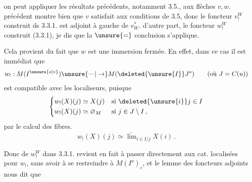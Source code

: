 on peut appliquer les résultats précédents,
notamment 3.5., aux flèches $v,w$. 
 précédent montre bien que $v$
satisfait aux conditions de 3.5, donc
le foncteur $v_!^W$ construit ds 3.3.1. est
adjoint à gauche de $v_W^*$.  d'autre part,
le foncteur $w_!^W$ construit  (3.3.1), je
dis que la $\unsure{=}$ conclusion s'applique.

Cela provient du fait que $w$ est une
immersion fermée. En effet, dans ce
cas il est immédiat que 
\[
w_!:M(I^{\unsure{o|\circ}})\unsure{\text{---}|\to} M(\deleted{\unsure{I}}J^o)\qquad(\text{où }J=C(u))
\]
est compatible avec les localiseurs,
puisque  
\[
\left\{\begin{aligned}
 w_!(X)(j)&\simeq X(j) &&\text{si }\deleted{\unsure{i}}j\in I\\
 w_!(X)(j)&\simeq\varnothing_M &&\text{si }j\in J\setminus I\,,
\end{aligned}\right.
\]
par le calcul des fibres.
\[
w_!(X)(j)\simeq\underrightarrow{\lim}_{i\in I/j}X(i)\,.
\]

Donc   de $w_!^W$  dans
3.3.1. revient en fait à passer directement
aux cat. localisées pour $w_!$, sans avoir
à se restreindre à $M(I^o)_c$, et le
lemme des foncteurs adjoints nous dit que
